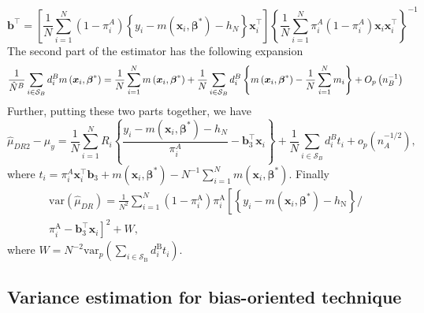\documentclass[
  letterpaper,
  DIV=11,
  numbers=noendperiod]{scrreprt}
\begin{document}
\[
\mathbf{b}^{\top}=\left[\frac{1}{N} \sum_{i=1}^N\left(1-\pi_i^A\right)\left\{y_i-m\left(\boldsymbol{x}_i, \boldsymbol{\beta}^*\right)-h_N\right\} \boldsymbol{x}_i^{\top}\right]\left\{\frac{1}{N} \sum_{i=1}^N \pi_i^A\left(1-\pi_i^A\right) \boldsymbol{x}_i \boldsymbol{x}_i^{\top}\right\}^{-1}
\] The second part of the estimator has the following expansion \[
\frac{1}{\hat{N}^B} \sum_{i \in \mathcal{S}_B} d_i^B m\left(\boldsymbol{x}_i,\boldsymbol{\beta}^*\right)=\frac{1}{N} \sum_{i=1}^N m\left(\boldsymbol{x}_i,\boldsymbol{\beta}^*\right)+\frac{1}{N} \sum_{i \in \mathcal{S}_B} d_i^B\left\{m\left(\boldsymbol{x}_i,\boldsymbol{\beta}^*\right)-\frac{1}{N} \sum_{i=1}^N m_i\right\}+O_p\left(n_B^{-1}\right)
\] Further, putting these two parts together, we have \[
\hat{\mu}_{D R 2}-\mu_y=\frac{1}{N} \sum_{i=1}^N R_i\left\{\frac{y_i-m\left(\boldsymbol{x}_i, \boldsymbol{\beta}^*\right)-h_N}{\pi_i^A}-\mathbf{b}_3^{\top} \boldsymbol{x}_i\right\}+\frac{1}{N} \sum_{i \in \mathcal{S}_B} d_i^B t_i+o_p\left(n_A^{-1 / 2}\right),
\] where
\(t_i=\pi_i^A \boldsymbol{x}_i^{\top} \mathbf{b}_3+m\left(\boldsymbol{x}_i, \boldsymbol{\beta}^*\right)-N^{-1} \sum_{i=1}^N m\left(\boldsymbol{x}_i, \boldsymbol{\beta}^*\right)\).
Finally \[
\begin{gathered} \text{var}(\hat{\mu}_{DR}) =
\frac{1}{N^2} \sum_{i=1}^N\left(1-\pi_i^{\mathrm{A}}\right) \pi_i^{\mathrm{A}}\left[\left\{y_i-m\left(\boldsymbol{x}_i, \boldsymbol{\beta}^*\right)-h_{\mathrm{N}}\right\} /\right. \\
\left.\pi_i^{\mathrm{A}}-\mathbf{b}_3^{\top} \boldsymbol{x}_i\right]^2+W,
\end{gathered}
\] where
\(W = N^{-2} \text{var}_p\left(\sum_{i \in \mathcal{S}_{\mathrm{B}}} d_i^{\mathrm{B}} t_i\right)\).

\hypertarget{variance-estimation-for-bias-oriented-technique}{%
\subsection{Variance estimation for bias-oriented
technique}\label{variance-estimation-for-bias-oriented-technique}}
\end{document}
